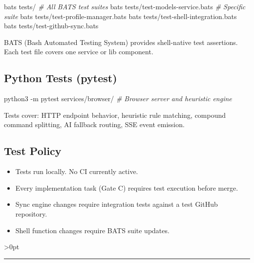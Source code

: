 \documentclass[11pt, a4paper, DIV=14]{scrartcl}
\newenvironment{Shaded}{%
  \vspace{4pt}%
  \begin{lrbox}{\ShadedBox}%
  \begin{minipage}{\dimexpr\linewidth-2\fboxsep\relax}%
  \vspace{4pt}%
}{%
  \vspace{4pt}%
  \end{minipage}%
  \end{lrbox}%
  \noindent\colorbox{CodeBg}{\usebox{\ShadedBox}}%
  \par\vspace{4pt}%
}
\newcommand{\AttributeTok}[1]{\textcolor{BabbTeal}{#1}}
\newcommand{\CommentTok}[1]{\textcolor{BabbGray}{\textit{#1}}}
\newcommand{\ExtensionTok}[1]{#1}
\newcommand{\NormalTok}[1]{#1}
\newenvironment{Highlighting}{\ttfamily\fontsize{8.2}{11}\selectfont}{}
\providecommand{\tightlist}{\setlength{\itemsep}{2pt}\setlength{\parskip}{0pt}}
\let\origRule\rule
\renewcommand{\rule}[3][0pt]{%
  \ifnum\dimexpr#3\relax>0pt
    \par\vspace{2pt}\noindent{\color{BabbBorder}\origRule[#1]{#2}{#3}}\par\vspace{2pt}%
  \else
    \origRule[#1]{#2}{#3}%
  \fi
}
\begin{document}
\begin{Shaded}
\begin{Highlighting}[]
\ExtensionTok{bats}\NormalTok{ tests/                          }\CommentTok{\# All BATS test suites}
\ExtensionTok{bats}\NormalTok{ tests/test{-}models{-}service.bats  }\CommentTok{\# Specific suite}
\ExtensionTok{bats}\NormalTok{ tests/test{-}profile{-}manager.bats}
\ExtensionTok{bats}\NormalTok{ tests/test{-}shell{-}integration.bats}
\ExtensionTok{bats}\NormalTok{ tests/test{-}github{-}sync.bats}
\end{Highlighting}
\end{Shaded}

BATS (Bash Automated Testing System) provides shell-native test
assertions. Each test file covers one service or lib component.

\subsection{Python Tests (pytest)}\label{python-tests-pytest}

\begin{Shaded}
\begin{Highlighting}[]
\ExtensionTok{python3} \AttributeTok{{-}m}\NormalTok{ pytest services/browser/  }\CommentTok{\# Browser server and heuristic engine}
\end{Highlighting}
\end{Shaded}

Tests cover: HTTP endpoint behavior, heuristic rule matching, compound
command splitting, AI fallback routing, SSE event emission.

\subsection{Test Policy}\label{test-policy}

\begin{itemize}
\tightlist
\item
  Tests run locally. No CI currently active.
\item
  Every implementation task (Gate C) requires test execution before
  merge.
\item
  Sync engine changes require integration tests against a test GitHub
  repository.
\item
  Shell function changes require BATS suite updates.
\end{itemize}

\begin{center}\rule{0.5\linewidth}{0.5pt}\end{center}
\end{document}
